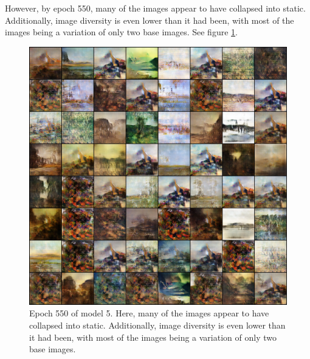 \documentclass[11pt,letterpaper]{article}
\begin{document}
				However, by epoch 550, many of the images appear to have collapsed into static.
				Additionally, image diversity is even lower than it had been, with most of the images being a variation of only two base images.
				See figure \ref{fig:wa128:epoch550generator}.
				\begin{figure}
					\centering
					\includegraphics[width=1.0\linewidth]{results/model5/epoch550_generator}
					\caption{Epoch 550 of model 5. Here, many of the images appear to have collapsed into static. Additionally, image diversity is even lower than it had been, with most of the images being a variation of only two base images.}
					\label{fig:wa128:epoch550generator}
				\end{figure}
\end{document}
